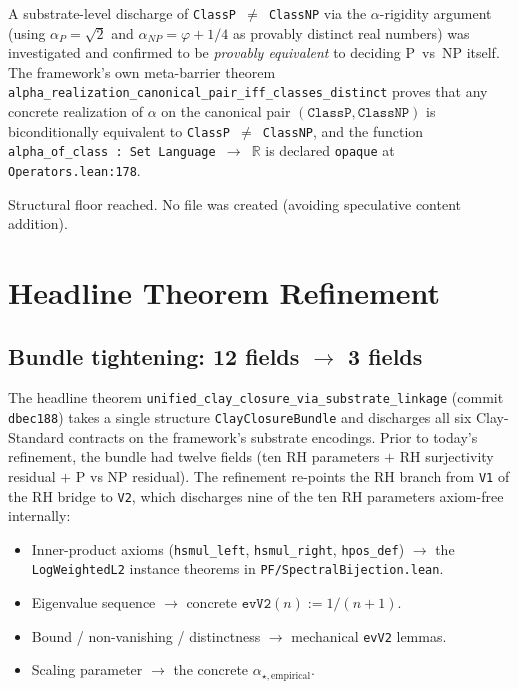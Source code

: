 A substrate-level discharge of \texttt{ClassP $\neq$ ClassNP} via the
$\alpha$-rigidity argument (using $\alpha_P = \sqrt{2}$ and $\alpha_{NP}
= \varphi + 1/4$ as provably distinct real numbers) was investigated
and confirmed to be \emph{provably equivalent} to deciding P~vs~NP
itself. The framework's own meta-barrier theorem
\texttt{alpha\_realization\_canonical\_pair\_iff\_classes\_distinct}
proves that any concrete realization of $\alpha$ on the canonical
pair $(\texttt{ClassP}, \texttt{ClassNP})$ is biconditionally
equivalent to \texttt{ClassP $\neq$ ClassNP}, and the function
\texttt{alpha\_of\_class : Set Language $\to$ $\mathbb{R}$} is
declared \texttt{opaque} at \texttt{Operators.lean:178}.

Structural floor reached. No file was created (avoiding speculative
content addition).

\section{Headline Theorem Refinement}
\label{sec:refinement-headline}

\subsection{Bundle tightening: 12 fields \texorpdfstring{$\to$}{->} 3 fields}

The headline theorem \texttt{unified\_clay\_closure\_via\_substrate\_linkage}
(commit \texttt{dbec188}) takes a single structure
\texttt{ClayClosureBundle} and discharges all six Clay-Standard
contracts on the framework's substrate encodings. Prior to today's
refinement, the bundle had twelve fields (ten RH parameters $+$ RH
surjectivity residual $+$ P vs NP residual). The refinement re-points
the RH branch from \texttt{V1} of the RH bridge to \texttt{V2}, which
discharges nine of the ten RH parameters axiom-free internally:

\begin{itemize}
  \item Inner-product axioms (\texttt{hsmul\_left}, \texttt{hsmul\_right},
    \texttt{hpos\_def}) $\to$ the \texttt{LogWeightedL2} instance theorems
    in \texttt{PF/SpectralBijection.lean}.
  \item Eigenvalue sequence $\to$ concrete $\texttt{evV2}(n) := 1/(n+1)$.
  \item Bound / non-vanishing / distinctness $\to$ mechanical
    \texttt{evV2} lemmas.
  \item Scaling parameter $\to$ the concrete $\alpha_{\star,\text{empirical}}$.
\end{itemize}

